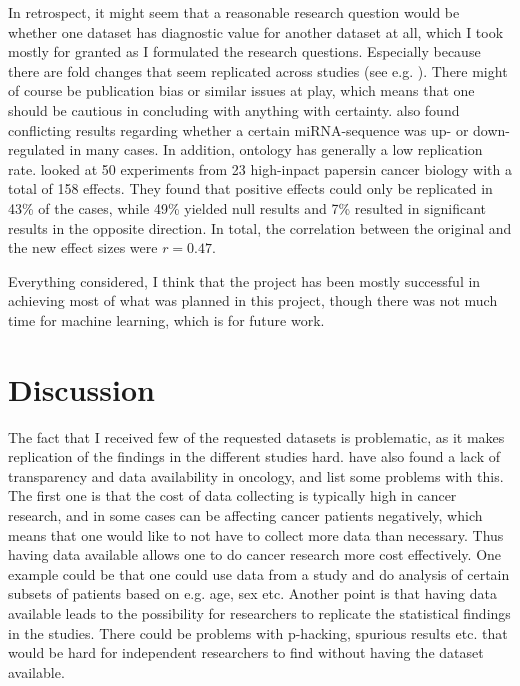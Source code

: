 In retrospect, it might seem that a reasonable research question would be whether one dataset has diagnostic value for another dataset at all, which I took mostly for granted as I formulated the research questions. Especially because there are fold changes that seem replicated across studies (see e.g. \citet{mirna_replicate_sequences}). There might of course be publication bias or similar issues at play, which means that one should be cautious in concluding with anything with certainty. \citet{mirna_replicate_sequences} also found conflicting results regarding whether a certain miRNA-sequence was up- or down-regulated in many cases. In addition, ontology has generally a low replication rate. \citet{cancer_replication} looked at 50 experiments from 23 high-inpact papersin cancer biology with a total of 158 effects. They found that positive effects could only be replicated in 43\% of the cases, while 49\% yielded null results and 7\% resulted in significant results in the opposite direction. In total, the correlation between the original and the new effect sizes were $r=0.47$.

Everything considered, I think that the project has been mostly successful in achieving most of what was planned in this project, though there was not much time for machine learning, which is for future work.


\section{Discussion}
\label{sec:discussion}

The fact that I received few of the requested datasets is problematic, as it makes replication of the findings in the different studies hard.
\citet{oncology_reproducability} have also found a lack of transparency and data availability in oncology, and list some problems with this.
The first one is that the cost of data collecting is typically high in cancer research, and in some cases can be affecting cancer patients negatively, which means that one would like to not have to collect more data than necessary.
Thus having data available allows one to do cancer research more cost effectively. One example could be that one could use data from a study and do analysis of certain subsets of patients based on e.g. age, sex etc.
Another point is that having data available leads to the possibility for researchers to replicate the statistical findings in the studies.
There could be problems with p-hacking, spurious results etc. that would be hard for independent researchers to find without having the dataset available.



